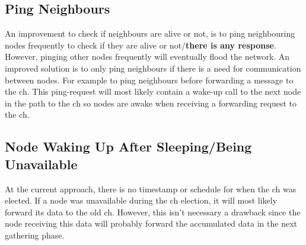 \documentclass[USenglish]{uit-thesis}
\begin{document}
\subsection{Ping Neighbours}
An improvement to check if neighbours are alive or not, is to ping neighbouring nodes frequently to check if they are alive or not/\textbf{there is any response}. However, pinging other nodes frequently will eventually flood the network. An improved solution is to only ping neighbours if there is a need for communication between nodes. For example to ping neighbours before forwarding a message to the \gls{ch}. This ping-request will most likely contain a wake-up call to the next node in the path to the \gls{ch} so nodes are awake when receiving a forwarding request to the \gls{ch}.



\subsection{Node Waking Up After Sleeping/Being Unavailable}




At the current approach, there is no timestamp or schedule for when the \gls{ch} was elected. If a node was unavailable during the \gls{ch} election, it will most likely forward its data to the old \gls{ch}. However, this isn't necessary a drawback since the node receiving this data will probably forward the accumulated data in the next gathering phase.
\end{document}
